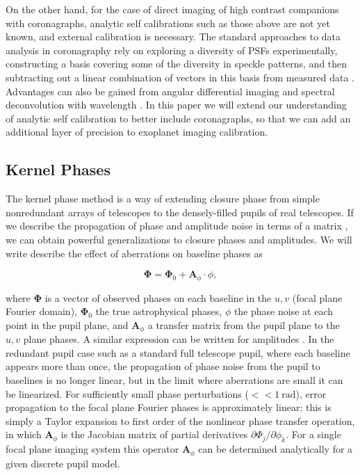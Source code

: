 \documentclass[modern]{aastex63}
\begin{document}
On the other hand, for the case of direct imaging of high contrast companions with coronagraphs, analytic self calibrations such as those above are not yet known, and external calibration is necessary. The standard approaches to data analysis in coronagraphy rely on exploring a diversity of PSFs experimentally, constructing a basis covering some of the diversity in speckle patterns, and then subtracting out a linear combination of vectors in this basis from measured data \citep[e.g. KLIP;][]{lafreniere07,soummer12,pueyo16}. Advantages can also be gained from angular differential imaging \citep[ADI;][]{marois06} and spectral deconvolution with wavelength \citep{sparks02}. In this paper we will extend our understanding of analytic self calibration to better include coronagraphs, so that we can add an additional layer of precision to exoplanet imaging calibration.

\subsection{Kernel Phases}

The kernel phase method is a way of extending closure phase from simple nonredundant arrays of telescopes to the densely-filled pupils of real telescopes. If we describe the propagation of phase and amplitude noise in terms of a matrix \citep{lannes1991}, we can obtain powerful generalizations to closure phases and amplitudes. We will write describe the effect of aberrations on baseline phases as

\begin{equation}
    \mathbf{\Phi} = \mathbf{\Phi}_0 + \mathbf{A}_\phi \cdot \phi,
\end{equation}

\noindent where $\mathbf{\Phi}$ is a vector of observed phases on each baseline in the $u,v$ (focal plane Fourier domain), $\mathbf{\Phi}_0$ the true astrophysical phases, $\phi$ the phase noise at each point in the pupil plane, and $\mathbf{A}_\phi$ a transfer matrix from the pupil plane to the $u,v$ plane phases. A similar expression can be written for amplitudes \citep{pope16}. In the redundant pupil case such as a standard full telescope pupil, where each baseline appears more than once, the propagation of phase noise from the pupil to baselines is no longer linear, but in the limit where aberrations are small it can be linearized. For sufficiently small phase perturbations ($<< 1~\text{rad}$), error propagation to the focal plane Fourier phases is approximately linear: this is simply a Taylor expansion to first order of the nonlinear phase transfer operation, in which $\mathbf{A}_\phi$ is the Jacobian matrix of partial derivatives $\partial\Phi_j/\partial\phi_k$. For a single focal plane imaging system this operator $\mathbf{A}_\phi$ can be determined analytically for a given discrete pupil model. 
\end{document}
